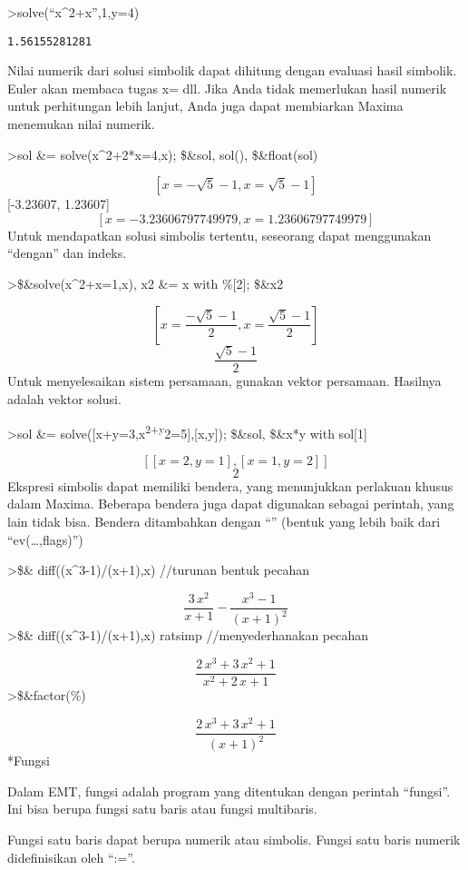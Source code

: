 \documentclass[
]{book}
\begin{document}
\textgreater solve(``x\^{}2+x'',1,y=4)

\begin{verbatim}
1.56155281281
\end{verbatim}

Nilai numerik dari solusi simbolik dapat dihitung dengan evaluasi hasil simbolik. Euler akan membaca tugas x= dll. Jika Anda tidak memerlukan hasil numerik untuk perhitungan lebih lanjut, Anda juga dapat membiarkan Maxima menemukan nilai numerik.

\textgreater sol \&= solve(x\^{}2+2*x=4,x); \$\&sol, sol(), \$\&float(sol)

\[\left[ x=-\sqrt{5}-1 , x=\sqrt{5}-1 \right]\] {[}-3.23607, 1.23607{]} \[\left[ x=-3.23606797749979 , x=1.23606797749979 \right]\]Untuk mendapatkan solusi simbolis tertentu, seseorang dapat menggunakan ``dengan'' dan indeks.

\textgreater\$\&solve(x\^{}2+x=1,x), x2 \&= x with \%{[}2{]}; \$\&x2

\[\left[ x=\frac{-\sqrt{5}-1}{2} , x=\frac{\sqrt{5}-1}{2} \right]\] \[\frac{\sqrt{5}-1}{2}\]Untuk menyelesaikan sistem persamaan, gunakan vektor persamaan. Hasilnya adalah vektor solusi.

\textgreater sol \&= solve({[}x+y=3,x\textsuperscript{2+y}2=5{]},{[}x,y{]}); \$\&sol, \$\&x*y with sol{[}1{]}

\[\left[ \left[ x=2 , y=1 \right]  , \left[ x=1 , y=2 \right] \right]\] \[2\]Ekspresi simbolis dapat memiliki bendera, yang menunjukkan perlakuan khusus dalam Maxima. Beberapa bendera juga dapat digunakan sebagai perintah, yang lain tidak bisa. Bendera ditambahkan dengan ``\textbar{}'' (bentuk yang lebih baik dari ``ev(\ldots,flags)'')

\textgreater\$\& diff((x\^{}3-1)/(x+1),x) //turunan bentuk pecahan

\[\frac{3\,x^2}{x+1}-\frac{x^3-1}{\left(x+1\right)^2}\]\textgreater\$\& diff((x\^{}3-1)/(x+1),x) \textbar{} ratsimp //menyederhanakan pecahan

\[\frac{2\,x^3+3\,x^2+1}{x^2+2\,x+1}\]\textgreater\$\&factor(\%)

\[\frac{2\,x^3+3\,x^2+1}{\left(x+1\right)^2}\]*Fungsi

Dalam EMT, fungsi adalah program yang ditentukan dengan perintah ``fungsi''. Ini bisa berupa fungsi satu baris atau fungsi multibaris.

Fungsi satu baris dapat berupa numerik atau simbolis. Fungsi satu baris numerik didefinisikan oleh ``:=''.
\end{document}
